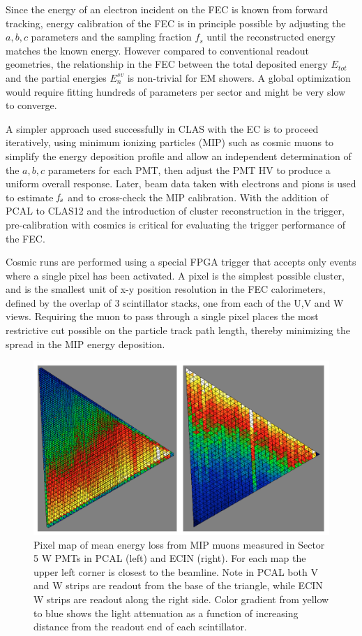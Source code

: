 Since the energy of an electron incident on the FEC is known from forward tracking, energy calibration of the FEC is in principle possible by adjusting the $a,b,c$ parameters and the sampling fraction $f_{s}$ until the reconstructed energy matches the known energy.  However compared to conventional readout geometries, the relationship in the FEC between the total deposited energy $E_{tot}$ and the partial energies $E_{n}^{sv}$ is non-trivial for EM showers.  A global optimization would require fitting hundreds of parameters per sector and might be very slow to converge.

A simpler approach used successfully in CLAS with the EC is to proceed iteratively, using minimum ionizing particles (MIP) such as cosmic muons to simplify the energy deposition profile and allow an independent determination of the $a,b,c$ parameters for each PMT, then adjust the PMT HV to produce a uniform overall response.  Later, beam data taken with electrons and pions is used to estimate $\it{f_s}$ and to cross-check the MIP calibration.  With the addition of PCAL to CLAS12 and the introduction of cluster reconstruction in the trigger, pre-calibration with cosmics is critical for evaluating the trigger performance of the FEC.

Cosmic runs are performed using a special FPGA trigger that accepts only events where a single pixel has been activated. A pixel is the simplest possible cluster, and is the smallest unit of x-y position resolution in the FEC calorimeters, defined by the overlap of 3 scintillator stacks, one from each of the U,V and W views.  Requiring the muon to pass through a single pixel places the most restrictive cut possible on the particle track path length, thereby minimizing the spread in the MIP energy deposition.   
\begin{figure}[hbt]
\centering
\includegraphics[width=1.0\columnwidth,keepaspectratio]{img/S9_1_1.png}
\caption[]{Pixel map of mean energy loss from MIP muons measured in Sector 5 W PMTs in PCAL (left) and ECIN (right). For each map the upper left corner is closest to the beamline. Note in PCAL both V and W strips are readout from the base of the triangle, while ECIN W strips are readout along the right side.  Color gradient from yellow to blue shows the light attenuation as a function of increasing distance from the readout end of each scintillator. }
\label{fig:S9_1_1}
\end{figure}

